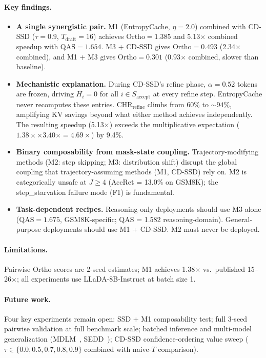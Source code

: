 \documentclass{article}
\newcommand{\ortho}{\text{Ortho}}
\newcommand{\qas}{\text{QAS}}
\newcommand{\chr}{\text{CHR}}
\newcommand{\Saccept}{S_{\text{accept}}}
\newcommand{\Tdraft}{T_{\text{draft}}}
\begin{document}
\paragraph{Key findings.}
\begin{itemize}
\item \textbf{A single synergistic pair.} M1 (EntropyCache, $\eta = 2.0$) combined with CD-SSD
  ($\tau = 0.9$, $\Tdraft = 16$) achieves $\ortho = 1.385$ and 5.13$\times$ combined speedup with
  $\qas = 1.654$. M3 + CD-SSD gives $\ortho = 0.493$ (2.34$\times$ combined), and M1 + M3 gives
  $\ortho = 0.301$ (0.93$\times$ combined, slower than baseline).

\item \textbf{Mechanistic explanation.} During CD-SSD's refine phase, $\alpha = 0.52$ tokens are
  frozen, driving $H_i = 0$ for all $i \in \Saccept$ at every refine step. EntropyCache never
  recomputes these entries. $\chr_{\text{refine}}$ climbs from 60\% to ${\sim}94\%$, amplifying KV
  savings beyond what either method achieves independently. The resulting speedup (5.13$\times$)
  exceeds the multiplicative expectation ($1.38\times \times 3.40\times = 4.69\times$) by 9.4\%.

\item \textbf{Binary composability from mask-state coupling.} Trajectory-modifying methods (M2:
  step skipping; M3: distribution shift) disrupt the global coupling that trajectory-assuming
  methods (M1, CD-SSD) rely on. M2 is categorically unsafe at $J \geq 4$ (AccRet = 13.0\% on
  GSM8K); the step\_starvation failure mode (F1) is fundamental.

\item \textbf{Task-dependent recipes.} Reasoning-only deployments should use M3 alone
  ($\qas = 1.675$, GSM8K-specific; QAS = 1.582 reasoning-domain). General-purpose deployments
  should use M1 + CD-SSD. M2 must never be deployed.
\end{itemize}

\paragraph{Limitations.} Pairwise Ortho scores are 2-seed estimates; M1 achieves 1.38$\times$
vs.\ published 15--26$\times$; all experiments use LLaDA-8B-Instruct at batch size 1.

\paragraph{Future work.} Four key experiments remain open: SSD + M1 composability test; full 3-seed
pairwise validation at full benchmark scale; batched inference and multi-model generalization
(MDLM~\cite{mdlm}, SEDD~\cite{sedd}); CD-SSD confidence-ordering value sweep ($\tau \in
\{0.0, 0.5, 0.7, 0.8, 0.9\}$ combined with naive-$T$ comparison).
\end{document}
